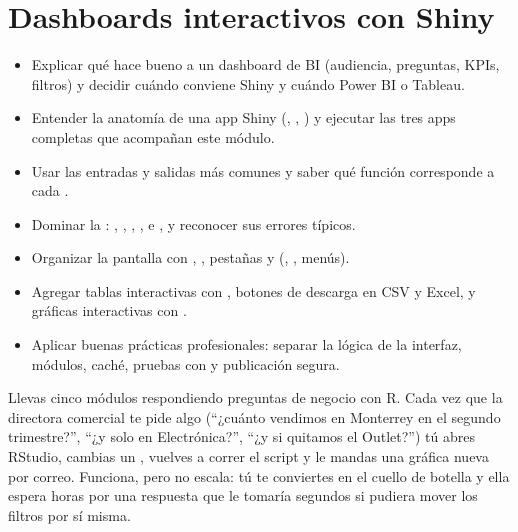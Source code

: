 \chapter{Dashboards interactivos con Shiny}
\label{cap:shiny}

\begin{objetivos}
\begin{itemize}
  \item Explicar qué hace bueno a un dashboard de BI (audiencia, preguntas,
        KPIs, filtros) y decidir cuándo conviene Shiny y cuándo Power BI o
        Tableau.
  \item Entender la anatomía de una app Shiny (, ,
        ) y ejecutar las tres apps completas que acompañan
        este módulo.
  \item Usar las entradas y salidas más comunes y saber qué función
         corresponde a cada .
  \item Dominar la : ,
        , , ,
         e , y reconocer sus errores
        típicos.
  \item Organizar la pantalla con ,
        , pestañas y 
        (, , menús).
  \item Agregar tablas interactivas con , botones de descarga en
        CSV y Excel, y gráficas interactivas con .
  \item Aplicar buenas prácticas profesionales: separar la lógica de la
        interfaz, módulos, caché, pruebas con  y
        publicación segura.
\end{itemize}
\end{objetivos}

Llevas cinco módulos respondiendo preguntas de negocio con R. Cada vez que la
directora comercial te pide algo (``¿cuánto vendimos en Monterrey en el
segundo trimestre?'', ``¿y solo en Electrónica?'', ``¿y si quitamos el
Outlet?'') tú abres RStudio, cambias un , vuelves a correr
el script y le mandas una gráfica nueva por correo. Funciona, pero no escala:
tú te conviertes en el cuello de botella y ella espera horas por una
respuesta que le tomaría segundos si pudiera mover los filtros por sí misma.


